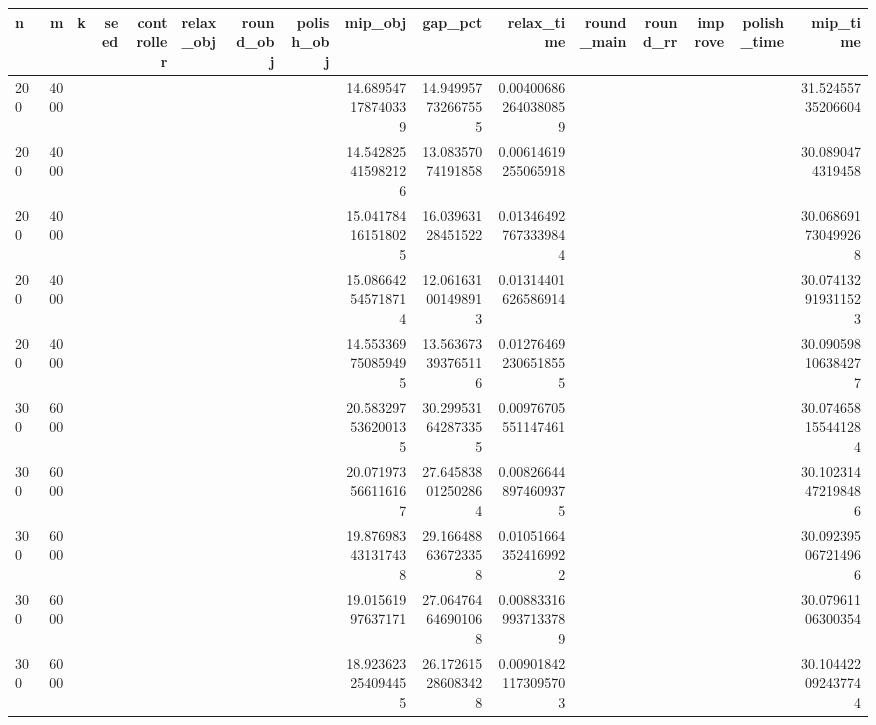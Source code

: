 \begin{tabular}{lrrrrlrrrrrrrrrr}
\hline
n & m & k & seed & controller & relax_obj & round_obj & polish_obj & mip_obj & gap_pct & relax_time & round_main & round_rr & improve & polish_time & mip_time \\ \hline
200 & 4000 &  &  &  &  &  &  & 14.689547178740339 & 14.949957732667555 & 0.004006862640380859 &  &  &  &  & 31.52455735206604 \\
200 & 4000 &  &  &  &  &  &  & 14.542825415982126 & 13.08357074191858 & 0.00614619255065918 &  &  &  &  & 30.0890474319458 \\
200 & 4000 &  &  &  &  &  &  & 15.041784161518025 & 16.03963128451522 & 0.013464927673339844 &  &  &  &  & 30.068691730499268 \\
200 & 4000 &  &  &  &  &  &  & 15.086642545718714 & 12.061631001498913 & 0.01314401626586914 &  &  &  &  & 30.074132919311523 \\
200 & 4000 &  &  &  &  &  &  & 14.553369750859495 & 13.563673393765116 & 0.012764692306518555 &  &  &  &  & 30.090598106384277 \\
300 & 6000 &  &  &  &  &  &  & 20.583297536200135 & 30.299531642873355 & 0.00976705551147461 &  &  &  &  & 30.074658155441284 \\
300 & 6000 &  &  &  &  &  &  & 20.071973566116167 & 27.645838012502864 & 0.008266448974609375 &  &  &  &  & 30.102314472198486 \\
300 & 6000 &  &  &  &  &  &  & 19.876983431317438 & 29.166488636723358 & 0.010516643524169922 &  &  &  &  & 30.092395067214966 \\
300 & 6000 &  &  &  &  &  &  & 19.01561997637171 & 27.064764646901068 & 0.008833169937133789 &  &  &  &  & 30.07961106300354 \\
300 & 6000 &  &  &  &  &  &  & 18.923623254094455 & 26.172615286083428 & 0.009018421173095703 &  &  &  &  & 30.104422092437744 \\
\hline
\end{tabular}
